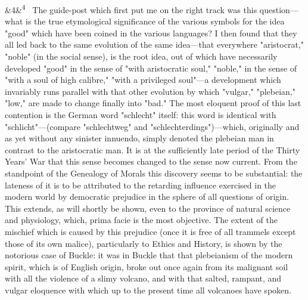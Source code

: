 \documentclass[12pt]{article}
\newcommand{\para}[1][]{\par\noindent\ifx&#1&\else\textsuperscript{\footnotesize #1}~\fi}
\begin{document}
\para[4] The guide-post which first put me on the right track was this question---what is the true etymological significance of the various symbols for the idea "good" which have been coined in the various languages? I then found that they all led back to the same evolution of the same idea---that everywhere "aristocrat," "noble" (in the social sense), is the root idea, out of which have necessarily developed "good" in the sense of "with aristocratic soul," "noble," in the sense of "with a soul of high calibre," "with a privileged soul"---a development which invariably runs parallel with that other evolution by which "vulgar," "plebeian," "low," are made to change finally into "bad." The most eloquent proof of this last contention is the German word "schlecht" itself: this word is identical with "schlicht"---(compare "schlechtweg" and "schlechterdings")---which, originally and as yet without any sinister innuendo, simply denoted the plebeian man in contrast to the aristocratic man. It is at the sufficiently late period of the Thirty Years' War that this sense becomes changed to the sense now current. From the standpoint of the Genealogy of Morals this discovery seems to be substantial: the lateness of it is to be attributed to the retarding influence exercised in the modern world by democratic prejudice in the sphere of all questions of origin. This extends, as will shortly be shown, even to the province of natural science and physiology, which, prima facie is the most objective. The extent of the mischief which is caused by this prejudice (once it is free of all trammels except those of its own malice), particularly to Ethics and History, is shown by the notorious case of Buckle: it was in Buckle that that plebeianism of the modern spirit, which is of English origin, broke out once again from its malignant soil with all the violence of a slimy volcano, and with that salted, rampant, and vulgar eloquence with which up to the present time all volcanoes have spoken.
\end{document}
